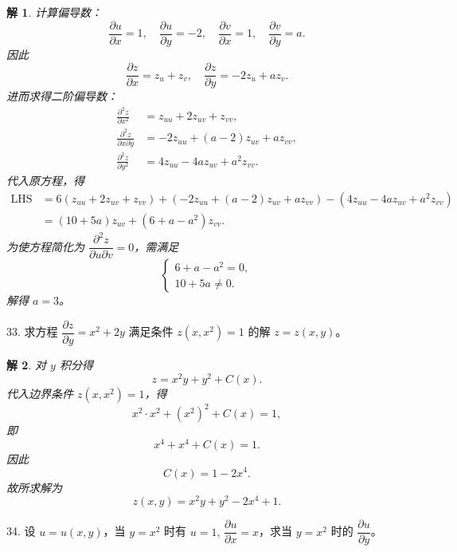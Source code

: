 \documentclass[a4paper,12pt]{article}
\newtheorem*{sol}{解}
\begin{document}
\begin{sol}
    计算偏导数：
    $$
        \frac{\partial u}{\partial x}=1,\quad \frac{\partial u}{\partial y}=-2,\quad \frac{\partial v}{\partial x}=1,\quad \frac{\partial v}{\partial y}=a.
    $$
    因此
    $$
        \frac{\partial z}{\partial x}=z_u+z_v,\quad \frac{\partial z}{\partial y}=-2z_u+az_v.
    $$
    进而求得二阶偏导数：
    $$
        \begin{aligned}
            \frac{\partial^2z}{\partial x^2}         & =z_{uu}+2z_{uv}+z_{vv},        \\
            \frac{\partial^2z}{\partial x\partial y} & =-2z_{uu}+(a-2)z_{uv}+az_{vv}, \\
            \frac{\partial^2z}{\partial y^2}         & =4z_{uu}-4az_{uv}+a^2z_{vv}.
        \end{aligned}
    $$
    代入原方程，得
    $$
        \begin{aligned}
            \text{LHS} & =6(z_{uu}+2z_{uv}+z_{vv})+(-2z_{uu}+(a-2)z_{uv}+az_{vv})-(4z_{uu}-4az_{uv}+a^2z_{vv}) \\
                       & =(10+5a)z_{uv}+(6+a-a^2)z_{vv}.
        \end{aligned}
    $$
    为使方程简化为 $\dfrac{\partial^2 z}{\partial u\partial v} = 0$，需满足
    $$
        \begin{cases}
            6+a-a^2=0, \\
            10+5a\neq 0.
        \end{cases}
    $$
    解得 $a=3$。
\end{sol}

33. 求方程 $\dfrac{\partial z}{\partial y} = x^2 + 2y$ 满足条件 $z(x,x^2) = 1$ 的解 $z = z(x,y)$。

\begin{sol}
    对 $y$ 积分得
    $$
        z = x^2y + y^2 + C(x).
    $$
    代入边界条件 $z(x,x^2) = 1$，得
    $$
        x^2 \cdot x^2 + (x^2)^2 + C(x) = 1,
    $$
    即
    $$
        x^4 + x^4 + C(x) = 1.
    $$
    因此
    $$
        C(x) = 1 - 2x^4.
    $$
    故所求解为
    $$
        z(x,y) = x^2y + y^2 - 2x^4 + 1.
    $$
\end{sol}

34. 设 $u = u(x,y)$，当 $y = x^2$ 时有 $u = 1,\,\dfrac{\partial u}{\partial x} = x$，求当 $y = x^2$ 时的 $\dfrac{\partial u}{\partial y}$。
\end{document}
